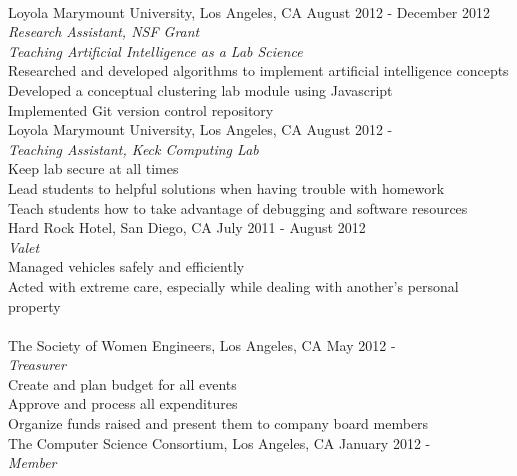 \documentclass[11pt]{article}
\begin{document}
\vspace{1.5mm}\\
\indent Loyola Marymount University, Los Angeles, CA \hfill August 2012 - December 2012\\
\indent \emph{Research Assistant, NSF Grant}\\
\indent \indent \emph{Teaching Artificial Intelligence as a Lab Science}\\
\indent \indent Researched and developed algorithms to implement artificial intelligence concepts\\
\indent \indent Developed a conceptual clustering lab module using Javascript\\
\indent \indent Implemented Git version control repository\vspace{2mm}\\
\indent Loyola Marymount University, Los Angeles, CA \hfill August 2012 -\\
\indent \emph{Teaching Assistant, Keck Computing Lab}\\
\indent \indent Keep lab secure at all times\\
\indent \indent Lead students to helpful solutions when having trouble with homework\\
\indent \indent Teach students how to take advantage of debugging and software resources\vspace{2mm}\\
\indent Hard Rock Hotel, San Diego, CA \hfill July 2011 - August 2012\\
\indent \emph{Valet}\\
\indent \indent Managed vehicles safely and efficiently\\
\indent \indent Acted with extreme care, especially while dealing with another's personal property\\

\vspace{1.5mm}\\
\indent The Society of Women Engineers, Los Angeles, CA \hfill May 2012 -\\
\indent \emph{Treasurer}\\
\indent \indent Create and plan budget for all events\\
\indent \indent Approve and process all expenditures\\
\indent \indent Organize funds raised and present them to company board members\vspace{2mm}\\
\indent The Computer Science Consortium, Los Angeles, CA \hfill January 2012 -\\
\indent \emph{Member}
\end{document}
